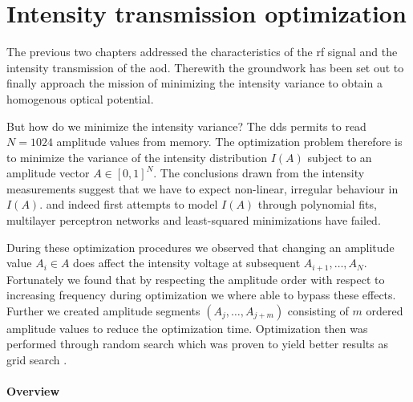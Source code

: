 \chapter{Intensity transmission optimization}

The previous two chapters addressed the characteristics of the \gls{rf}
signal and the intensity transmission of the \gls{aod}. Therewith the
groundwork has been set out to finally approach the mission of minimizing the
intensity variance to obtain a homogenous optical potential.

But how do we minimize the intensity variance? The \gls{dds} permits to read
$N=1024$ amplitude values from memory. The optimization problem therefore is to
minimize the variance of the intensity distribution $I(A)$ subject to an
amplitude vector $A\in[0,1]^N$. The conclusions drawn from the intensity
measurements suggest that we have to expect non-linear, irregular behaviour
in $I(A)$. and indeed first attempts to model $I(A)$ through polynomial fits,
multilayer perceptron networks and least-squared minimizations have failed.

During these optimization procedures we observed that changing an amplitude
value $A_i\in A$ does affect the intensity voltage at subsequent
$A_{i+1},\dots,A_N$. Fortunately we found that by respecting the amplitude
order with respect to increasing frequency during optimization we where able
to bypass these effects. Further we created amplitude segments
$\left(A_j,\dots,A_{j+m}\right)$ consisting of $m$ ordered amplitude values
to reduce the optimization time. Optimization then was performed through
random search which was proven to yield better results as grid search
\cite{Bergstra2012}.

\subsubsection{Overview}

